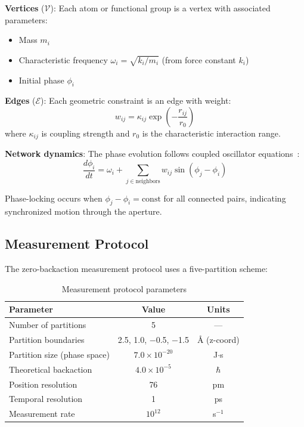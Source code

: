\documentclass[twocolumn,amsmath,amssymb,aps,prb,superscriptaddress,longbibliography]{revtex4-2}
\newcommand{\calV}{\mathcal{V}}
\newcommand{\calE}{\mathcal{E}}
\begin{document}
\textbf{Vertices} ($\calV$): Each atom or functional group is a vertex with associated parameters:
\begin{itemize}
\item Mass $m_i$
\item Characteristic frequency $\omega_i = \sqrt{k_i/m_i}$ (from force constant $k_i$)
\item Initial phase $\phi_i$
\end{itemize}

\textbf{Edges} ($\calE$): Each geometric constraint is an edge with weight:
\begin{equation}
w_{ij} = \kappa_{ij} \exp\left(-\frac{r_{ij}}{r_0}\right)
\end{equation}
where $\kappa_{ij}$ is coupling strength and $r_0$ is the characteristic interaction range.

\textbf{Network dynamics}: The phase evolution follows coupled oscillator equations~\cite{Kuramoto1984}:
\begin{equation}
\frac{d\phi_i}{dt} = \omega_i + \sum_{j \in \text{neighbors}} w_{ij} \sin(\phi_j - \phi_i)
\label{eq:kuramoto}
\end{equation}

Phase-locking occurs when $\phi_j - \phi_i = \text{const}$ for all connected pairs, indicating synchronized motion through the aperture.

\subsection{Measurement Protocol}
\label{sec:protocol}

The zero-backaction measurement protocol uses a five-partition scheme:

\begin{table}[h]
\centering
\caption{Measurement protocol parameters}
\label{tab:protocol}
\begin{tabular}{lcc}
\toprule
Parameter & Value & Units \\
\midrule
Number of partitions & 5 & --- \\
Partition boundaries & 2.5, 1.0, $-$0.5, $-$1.5 & \AA{} (z-coord) \\
Partition size (phase space) & $7.0 \times 10^{-20}$ & J$\cdot$s \\
Theoretical backaction & $4.0 \times 10^{-5}$ & $\hbar$ \\
Position resolution & 76 & pm \\
Temporal resolution & 1 & ps \\
Measurement rate & $10^{12}$ & s$^{-1}$ \\
\bottomrule
\end{tabular}
\end{table}
\end{document}
